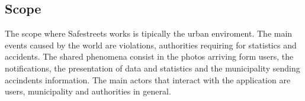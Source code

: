 \subsection{Scope}
The scope where Safestreets works is tipically the urban enviroment. The main events caused by the world are violations, authorities requiring for statistics and accidents.
The shared phenomena consist in the photos arriving form users, the notifications, the presentation of data and statistics and the municipality sending accindents information.  
The main actors that interact with the application are users, municipality and authorities in general.
